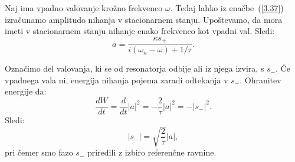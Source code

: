 Naj ima vpadno valovanje krožno  frekvenco $\omega$. Tedaj lahko iz enačbe~(\ref{3.37}) 
izračunamo amplitudo nihanja v stacionarnem stanju. Upoštevamo, 
da mora imeti v stacionarnem stanju nihanje enako frekvenco
kot vpadni val. Sledi:
\begin{equation}
a=\frac{\kappa s_{+}}{i(\omega_{n}-\omega)+1/\tau}.
\label{3.38}
\end{equation}
 
Označimo del valovanja, ki se od resonatorja odbije ali iz njega izvira, s $s_{-}$.
Če vpadnega vala ni, energija nihanja pojema zaradi odtekanja v $s_{-}$.
Ohranitev energije da:
\begin{equation}
\frac{dW}{dt}=\frac{d}{dt}|a|^{2}=-\frac{2}{\tau}|a|^{2}=-|s_{-}|^{2}.
\label{3.39}
\end{equation}
Sledi:
\begin{equation}
|s_{-}|=\sqrt{\frac{2}{\tau}}|a|,
\label{3.40}
\end{equation}
pri čemer smo fazo $s_{-}$ priredili z izbiro referenčne ravnine.

